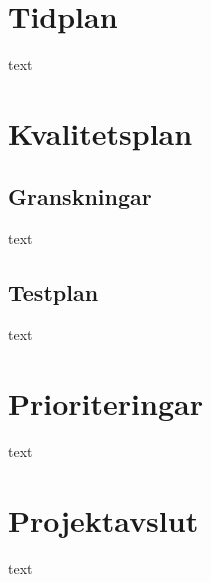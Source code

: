 \documentclass[11pt]{article}
\begin{document}
\begin{flushleft}
\begin{longtable}{| p{.05\linewidth} | p{.15\linewidth} | p{.4\linewidth} | p{.15\linewidth} | p{.1\linewidth} |}
\end{longtable}

\pagebreak
\section{Tidplan}
text

\pagebreak
\section{Kvalitetsplan}
\subsection{Granskningar}
text

\subsection{Testplan}
text

\pagebreak
\section{Prioriteringar}
text

\pagebreak
\section{Projektavslut}
text

\end{flushleft}
\end{document}
